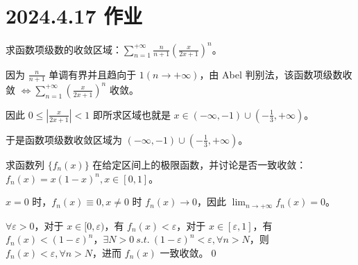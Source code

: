 \ifx\allfiles\undefined

\date{}
\author{尹锦润}

\maketitle
\fi

\section{2024.4.17 作业}

\begin{ques}
	求函数项级数的收敛区域：$\displaystyle \sum _{n=1}^{+\infty }\frac{n}{n+1}\left(\frac{x}{2x+1}\right)^{n}$。
\end{ques}



因为 $\displaystyle \frac{n}{n+1}$ 单调有界并且趋向于 $\displaystyle 1\left( n\rightarrow +\infty \right)$，由 Abel 判别法，该函数项级数收敛 $\displaystyle \Leftrightarrow $$\displaystyle \sum _{n=1}^{+\infty }\left(\frac{x}{2x+1}\right)^{n}$ 收敛。

因此 $\displaystyle 0\leqslant \left| \frac{x}{2x+1}\right| < 1$ 即所求区域也就是 $\displaystyle x\in ( -\infty ,-1) \cup \left( -\frac{1}{3} ,+\infty \right)$。

于是函数项级数收敛区域为 $\displaystyle ( -\infty ,-1) \cup \left( -\frac{1}{3} ,+\infty \right)$。



\begin{ques}
	求函数列 $\displaystyle \{f_{n}( x)\}$ 在给定区间上的极限函数，并讨论是否一致收敛：$\displaystyle f_{n}( x) =x( 1-x)^{n} ,x\in [ 0,1]$。
\end{ques}



$\displaystyle x=0$ 时，$\displaystyle f_{n}( x) \equiv 0,x\neq 0$ 时 $\displaystyle f_{n}( x)\rightarrow 0$，因此 $\displaystyle \lim _{n\rightarrow +\infty } f_{n}( x) =0$。

$\displaystyle \forall \varepsilon  >0$，对于 $\displaystyle x\in [ 0,\varepsilon )$，有 $\displaystyle f_{n}( x) < \varepsilon $，对于 $\displaystyle x\in [ \varepsilon ,1]$，有 $\displaystyle f_{n}( x) < ( 1-\varepsilon )^{n}$，$\displaystyle \exists N >0\ s.t.\ ( 1-\varepsilon )^{n} < \varepsilon ,\forall n >N$，则 $\displaystyle f_{n}( x) < \varepsilon ,\forall n >N$，进而 $\displaystyle f_{n}( x)$ 一致收敛。\qed 





